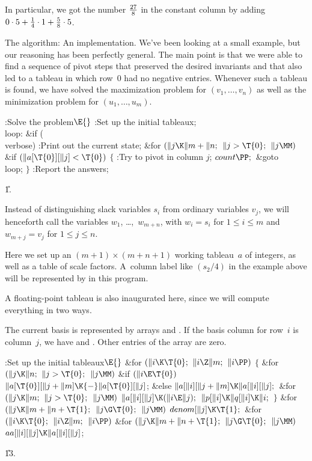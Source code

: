 In particular, we got the number ${27\over8}$ in the constant column
by adding $0\cdot 5+{1\over4}\cdot1+{5\over8}\cdot5$.

\fi

The algorithm: An implementation.
We've been looking at a small example, but our reasoning has been perfectly
general. The main point is that we were able to find a sequence of pivot steps
that preserved the desired invariants and that also led to a tableau
in which row~0 had no negative entries. Whenever such a tableau is
found, we have solved the maximization problem for $(v_1,\ldots,v_n)$
as well as the minimization problem for $(u_1,\ldots,u_m)$.

\Y\B\4:Solve the problem\X${}\E{}$\6
:Set up the initial tableaux\X;\6
\4\\{loop}:\5
\&{if} (\\{verbose})\1\5
:Print out the current state\X;\2\6
\&{for} ${}(\|j\K\|m+\|n;{}$ ${}\|j>\T{0};{}$ ${}\|j\MM){}$\1\6
\&{if} ${}(\|a[\T{0}][\|j]<\T{0}){}$\5
${}\{{}$\1\6
:Try to pivot in column $j$\X;\6
${}\\{count}\PP;{}$\6
\&{goto} \\{loop};\6
\4${}\}{}$\2\2\6
:Report the answers\X;\par
\U1.\fi

Instead of distinguishing slack variables $s_i$ from ordinary
variables
$v_j$, we will henceforth call the variables $w_1$, \dots,~$w_{m+n}$,
with $w_i=s_i$ for $1\le i\le m$ and $w_{m+j}=v_j$ for $1\le j\le n$.

Here we set up an $(m+1)\times(m+n+1)$ working tableau~$a$ of integers, as
well as a table of scale factors. A~column label like $(s_2/4)$ in the
example above will be represented by  in this
program.

A floating-point tableau  is also inaugurated here, since we will
compute everything in two ways.

The current basis is represented by arrays  and . If the basis
column for row~$i$ is column~$j$, we have  and .
Other entries of the  array are zero.

\Y\B\4:Set up the initial tableaux\X${}\E{}$\6
\&{for} ${}(\|i\K\T{0};{}$ ${}\|i\Z\|m;{}$ ${}\|i\PP){}$\5
${}\{{}$\1\6
\&{for} ${}(\|j\K\|n;{}$ ${}\|j>\T{0};{}$ ${}\|j\MM){}$\1\6
\&{if} ${}(\|i\E\T{0}){}$\1\5
${}\|a[\T{0}][\|j+\|m]\K{-}\|a[\T{0}][\|j]{}$;\5
\2\&{else}\1\5
${}\|a[\|i][\|j+\|m]\K\|a[\|i][\|j];{}$\2\2\6
\&{for} ${}(\|j\K\|m;{}$ ${}\|j>\T{0};{}$ ${}\|j\MM){}$\1\5
${}\|a[\|i][\|j]\K(\|i\E\|j);{}$\2\6
${}\|p[\|i]\K\|q[\|i]\K\|i;{}$\6
\4${}\}{}$\2\6
\&{for} ${}(\|j\K\|m+\|n+\T{1};{}$ ${}\|j\G\T{0};{}$ ${}\|j\MM){}$\1\5
${}\\{denom}[\|j]\K\T{1};{}$\2\6
\&{for} ${}(\|i\K\T{0};{}$ ${}\|i\Z\|m;{}$ ${}\|i\PP){}$\1\6
\&{for} ${}(\|j\K\|m+\|n+\T{1};{}$ ${}\|j\G\T{0};{}$ ${}\|j\MM){}$\1\5
${}\\{aa}[\|i][\|j]\K\|a[\|i][\|j]{}$;\2\2\par
\U13.\fi

